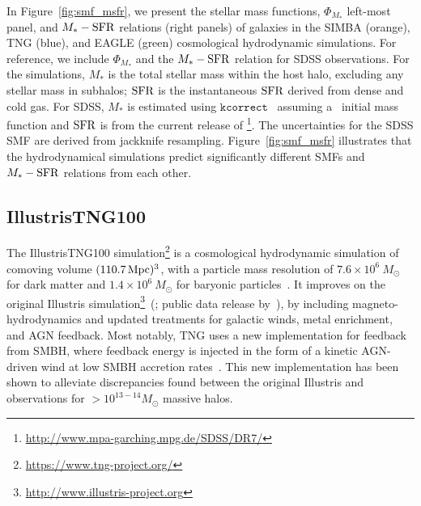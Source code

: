 In Figure~\ref{fig:smf_msfr}, we present the stellar mass functions,
$\Phi_{M_*}$ left-most panel, and $M_*-{\rm SFR}$ relations (right panels) of
galaxies in the  SIMBA (orange), TNG (blue), and EAGLE (green) cosmological
hydrodynamic simulations.  For reference, we include $\Phi_{M_*}$ and the 
$M_*-{\rm SFR}$ relation for SDSS observations. For the simulations, $M_*$ is the
total stellar mass within the host halo, excluding
any stellar mass in subhalos; ${\rm SFR}$ is the instantaneous ${\rm SFR}$ derived from
dense and cold gas. 
For SDSS, $M_*$ is estimated using $\mathtt{kcorrect}$~\citep{blanton2007a} 
assuming a~\cite{chabrier2003} initial mass function and ${\rm SFR}$ is from the
current release of \cite{brinchmann2004}\footnote{\url{http://www.mpa-garching.mpg.de/SDSS/DR7/}}.
The uncertainties for the SDSS SMF are derived from jackknife resampling.
Figure~\ref{fig:smf_msfr} illustrates that the hydrodynamical simulations
predict significantly different SMFs and $M_*-{\rm SFR}$ relations from each other.

\subsection{IllustrisTNG100} \label{sec:tng}
The IllustrisTNG100 simulation\footnote{\url{https://www.tng-project.org/}}
is a cosmological hydrodynamic simulation of comoving volume 
$(110.7\,{\rm Mpc})^3$, with a particle mass resolution of $7.6 \times 10^{6}\ M_\odot$ for dark matter and $1.4 \times 10^{6}\ M_\odot$ for baryonic particles~\citep{nelson2018, pillepich2018, springel2018}. It improves on
the original Illustris simulation\footnote{\url{http://www.illustris-project.org}}~(\citealt{vogelsberger2014, genel2014};
public data release by~\citealt{nelson2015}), by including
magneto-hydrodynamics and updated treatments for galactic winds, metal
enrichment, and AGN feedback. Most notably, TNG uses a new implementation for
feedback from SMBH, where feedback energy is injected in the form of a kinetic
AGN-driven wind at low SMBH accretion rates~\citep{weinberger2018}. This new
implementation has been shown to alleviate discrepancies found between the
original Illustris and observations for $> 10^{13-14} M_\odot$ massive halos. 

